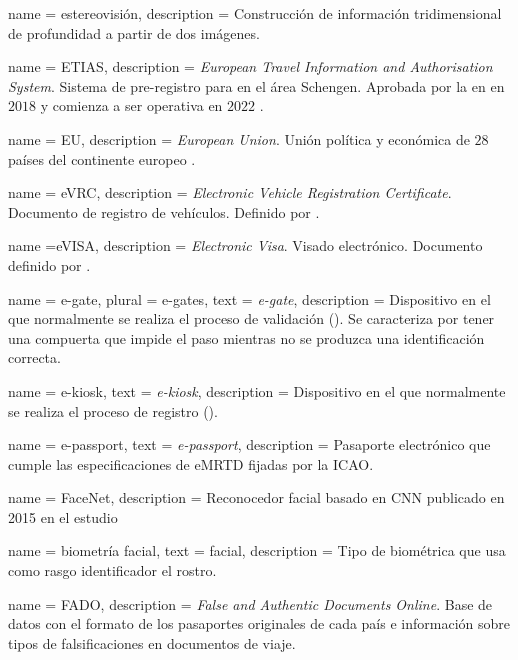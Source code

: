 {
    name        = {estereovisión},
    description = {Construcción de información tridimensional de profundidad a partir de dos imágenes.}
}

{
    name        = {ETIAS},
    description = {\textit{European Travel Information and Authorisation System}. Sistema de pre-registro para  en el área \Gls{Schengen}. Aprobada por la en en $2018$ y comienza a ser operativa en $2022$ \cite{union2018directiveETIAS}.}
}

{
    name        = {EU},
    description = {\textit{European Union}. Unión política y económica de $28$ países del continente europeo \cite{EUOnline}.}
}

{
    name        = {eVRC},
    description = {\textit{Electronic Vehicle Registration Certificate}. Documento de registro de vehículos. Definido por  \cite{ICAOOnline}.}
}

{
    name        =eVISA,
    description = {\textit{Electronic Visa}. Visado electrónico. Documento definido por  \cite{ICAOOnline}.}
}

{
    name        = {e-gate},
    plural      = {e-gates},
    text        = {\mbox{\textit{e-gate}}},
    description = {Dispositivo en el que normalmente se realiza el proceso de validación (). Se caracteriza por tener una compuerta que impide el paso mientras no se produzca una identificación correcta.}
}

{
    name        = {e-kiosk},
    text        = {\mbox{\textit{e-kiosk}}},
    description = {Dispositivo en el que normalmente se realiza el proceso de registro ().}
}

{
    name        = {e-passport},
    text        = {\mbox{\textit{e-passport}}},
    description = {Pasaporte electrónico que cumple las especificaciones de eMRTD fijadas por la ICAO.}
}

{
    name        = {FaceNet},
    description = {Reconocedor facial basado en CNN publicado en 2015 en el estudio \cite{schroff2015facenet}}
}

{
    name        = {biometría facial},
    text        = {facial},
    description = {Tipo de biométrica que usa como rasgo identificador el rostro.}
}

{
    name        = {FADO},
    description = {\textit{False and Authentic Documents Online}. Base de datos con el formato de los pasaportes originales de cada país e información sobre tipos de falsificaciones en documentos de viaje.}
}

